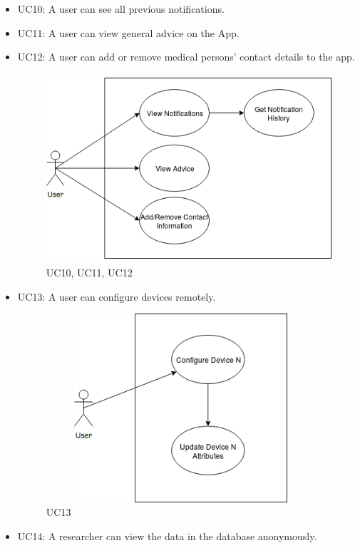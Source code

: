 \begin{itemize}
	\item UC10: A user can see all previous notifications.

	\item UC11: A user can view general advice on the App.
	
	\item UC12: A user can add or remove medical persons' contact details to the app.
\begin{center}
\begin{figure}[!htb]
	\includegraphics[width=15cm, height=7cm]{Diagrams/UseCase101112.png}
	\caption{UC10, UC11, UC12}
\end{figure}
\end{center}
	
	\item UC13: A user can configure devices remotely.
\begin{center}
\begin{figure}[!htb]
	\includegraphics[width=10cm, height=7cm]{Diagrams/UseCase13.png}
	\caption{UC13}
\end{figure}
\end{center}
		
	\item UC14: A researcher can view the data in the database anonymously.	
	

\end{itemize}

\pagebreak
